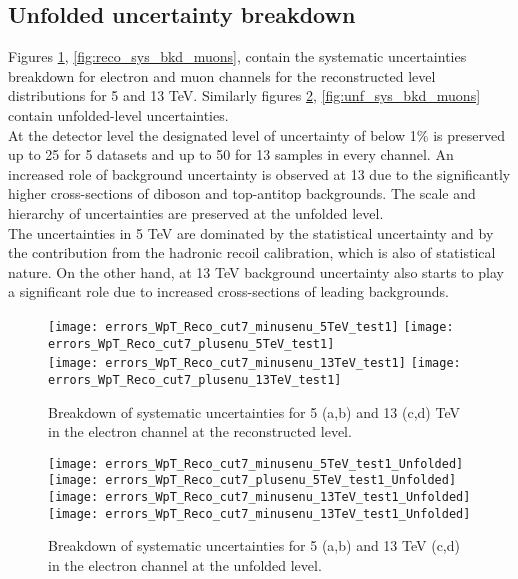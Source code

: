 \subsection{Unfolded uncertainty breakdown}
Figures \ref{fig:reco_sys_bkd_elec}, \ref{fig:reco_sys_bkd_muons}, contain the systematic uncertainties breakdown for electron and muon channels for the reconstructed level distributions for 5 and 13 TeV. Similarly figures \ref{fig:unf_sys_bkd_elec}, \ref{fig:unf_sys_bkd_muons} contain unfolded-level uncertainties. \\
At the detector level the designated level of uncertainty of below 1\% is preserved up to 25 \gev{} for 5 \tev{} datasets and up to 50 \gev{} for 13 \tev{} samples in every channel. An increased role of background uncertainty is observed at 13 \tev{} due to the significantly higher cross-sections of diboson and top-antitop backgrounds.
The scale and hierarchy of uncertainties are preserved at the unfolded level. \\
The uncertainties in 5 TeV are dominated by the statistical uncertainty and by the contribution from the hadronic recoil calibration, which is also of statistical nature. On the other hand, at 13 TeV background uncertainty also starts to play a significant role due to increased cross-sections of leading backgrounds.

\begin{figure}[h]
	\centering
	{\texttt{[image: errors\_WpT\_Reco\_cut7\_minusenu\_5TeV\_test1]}}
	{\texttt{[image: errors\_WpT\_Reco\_cut7\_plusenu\_5TeV\_test1]}} \\
	{\texttt{[image: errors\_WpT\_Reco\_cut7\_minusenu\_13TeV\_test1]}}
	{\texttt{[image: errors\_WpT\_Reco\_cut7\_plusenu\_13TeV\_test1]}}
	
	\caption{ Breakdown of systematic uncertainties for 5 (a,b) and 13 (c,d) TeV in the electron channel at the reconstructed level.}
	\label{fig:reco_sys_bkd_elec}
\end{figure}

\begin{figure}[h]
	\centering
	{\texttt{[image: errors\_WpT\_Reco\_cut7\_minusenu\_5TeV\_test1\_Unfolded]}}
	{\texttt{[image: errors\_WpT\_Reco\_cut7\_plusenu\_5TeV\_test1\_Unfolded]}} \\
	{\texttt{[image: errors\_WpT\_Reco\_cut7\_minusenu\_13TeV\_test1\_Unfolded]}}
	{\texttt{[image: errors\_WpT\_Reco\_cut7\_minusenu\_13TeV\_test1\_Unfolded]}}
	\caption{ Breakdown of systematic uncertainties for 5 (a,b) and 13 TeV (c,d) in the electron channel at the unfolded level.}
	\label{fig:unf_sys_bkd_elec}
\end{figure}

